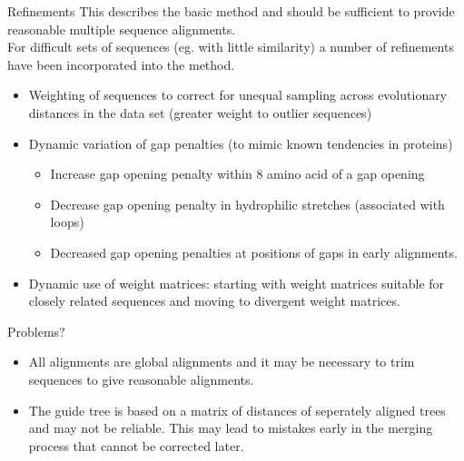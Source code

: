 \documentclass[pdf]{beamer}
\begin{document}
{\begin{frame}{Refinements}
  This describes the basic method and should be sufficient to provide
  reasonable multiple sequence alignments.\\
  For difficult sets of sequences (eg. with little similarity) a number
  of refinements have been incorporated into the method.
  \small
  \begin{itemize}
  \item Weighting of sequences to correct for unequal sampling across
    evolutionary distances in the data set (greater weight to outlier sequences)
  \item Dynamic variation of gap penalties (to mimic known tendencies in
    proteins)
    \begin{itemize}
    \item Increase gap opening penalty within 8 amino acid of a gap opening
    \item Decrease gap opening penalty in hydrophilic stretches (associated
      with loops)
    \item Decreased gap opening penalties at positions of gaps in early
      alignments.
    \end{itemize}
  \item Dynamic use of weight matrices: starting with weight matrices suitable
    for closely related sequences and moving to divergent weight matrices.
  \end{itemize}
\end{frame}

\begin{frame}{Problems?}
  \begin{itemize}
    \item All alignments are global alignments and it may be necessary to
      trim sequences to give reasonable alignments.
    \item The guide tree is based on a matrix of distances of seperately aligned
      trees and may not be reliable. This may lead to mistakes early in the
      merging process that cannot be corrected later.
  \end{itemize}
  
\end{frame}

}
\end{document}
